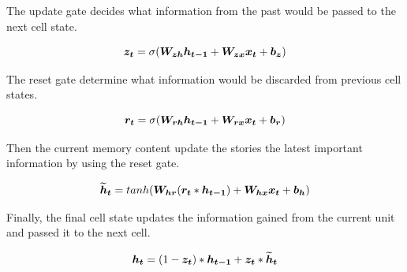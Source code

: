 The update gate decides what information from the past would be passed to the next cell state.

\[\vect{z_t} = \sigma(\matr{W_{zh}}\vect{h_{t-1}}+\matr{W_{zx}}\vect{x_t} + \vect{b_z}) \]

The reset gate determine what information would be discarded from previous cell states.

\[\vect{r_t} = \sigma(\matr{W_{rh}}\vect{h_{t-1}}+\matr{W_{rx}}\vect{x_t} + \vect{b_r}) \]

Then the current memory content update the stories the latest important information by using the reset gate.

\[\vect{\widetilde{h}_t} = tanh(\matr{W_{hr}}(\vect{r_t}*\vect{h_{t-1}}) + \matr{W_{hx}}\vect{x_t} + \vect{b_h})\]

Finally, the final cell state updates the information gained from the current unit and passed it to the next cell.

\[\vect{h_t} = (1-\vect{z_t})*\vect{h_{t-1}} + \vect{z_t}*\vect{\widetilde{h}_t}\]